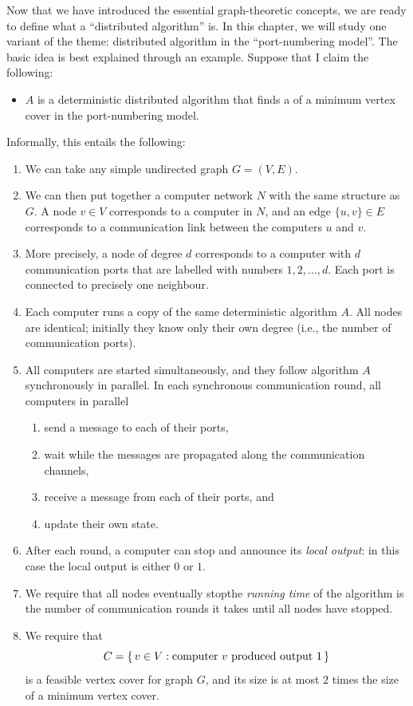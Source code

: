 Now that we have introduced the essential graph-theoretic concepts, we are ready to define what a ``distributed algorithm'' is. In this chapter, we will study one variant of the theme: distributed algorithm in the ``port-numbering model''. The basic idea is best explained through an example. Suppose that I claim the following:
\begin{itemize}
    \item $A$ is a deterministic distributed algorithm that finds a  of a minimum vertex cover in the port-numbering model.
\end{itemize}
Informally, this entails the following:
\begin{enumerate}
    \item We can take any simple undirected graph $G = (V,E)$.
    \item We can then put together a computer network $N$ with the same structure as $G$. A node $v \in V$ corresponds to a computer in $N$, and an edge $\{u,v\} \in E$ corresponds to a communication link between the computers $u$ and $v$.
    \item More precisely, a node of degree $d$ corresponds to a computer with $d$ communication ports that are labelled with numbers $1, 2, \dotsc, d$. Each port is connected to precisely one neighbour.
    \item Each computer runs a copy of the same deterministic algorithm $A$. All nodes are identical; initially they know only their own degree (i.e., the number of communication ports).
    \item All computers are started simultaneously, and they follow algorithm $A$ synchronously in parallel. In each synchronous communication round, all computers in parallel
    \begin{enumerate}[label=(\arabic*)]
        \item send a message to each of their ports,
        \item wait while the messages are propagated along the communication channels,
        \item receive a message from each of their ports, and
        \item update their own state.
    \end{enumerate}
    \item After each round, a computer can stop and announce its \emph{local output}: in this case the local output is either $0$ or $1$.
    \item We require that all nodes eventually stop\mydash the \emph{running time} of the algorithm is the number of communication rounds it takes until all nodes have stopped.
    \item We require that
        \[ C = \{\,  v \in V : \text{computer $v$ produced output $1$}  \,\} \]
        is a feasible vertex cover for graph $G$, and its size is at most $2$ times the size of a minimum vertex cover. 
\end{enumerate}
